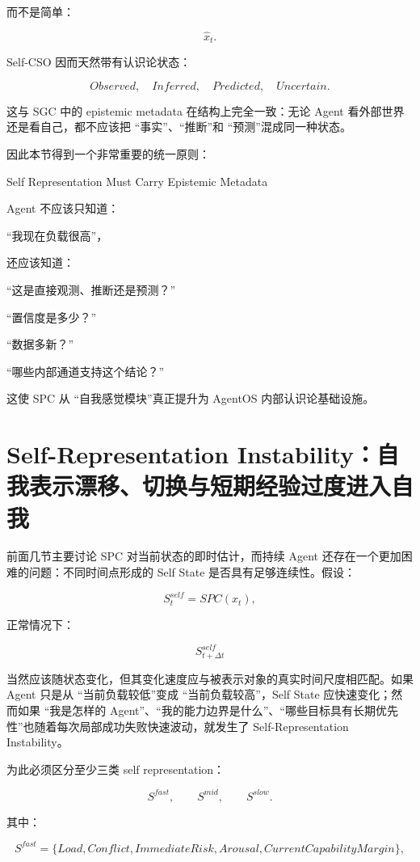 而不是简单：

\[
\hat{x}_t.
\]

Self-CSO 因而天然带有认识论状态：

\[
Observed,
\quad
Inferred,
\quad
Predicted,
\quad
Uncertain.
\]

这与 SGC 中的 epistemic metadata 在结构上完全一致：无论 Agent 看外部世界还是看自己，都不应该把 ``事实''、``推断''和 ``预测''混成同一种状态。

因此本节得到一个非常重要的统一原则：

\begin{proposition*}
Self Representation Must Carry Epistemic Metadata
\end{proposition*}

Agent 不应该只知道：

``我现在负载很高''，

还应该知道：

``这是直接观测、推断还是预测？''

``置信度是多少？''

``数据多新？''

``哪些内部通道支持这个结论？''

这使 SPC 从 ``自我感觉模块''真正提升为 AgentOS 内部认识论基础设施。

\section{Self-Representation Instability：自我表示漂移、切换与短期经验过度进入自我}

前面几节主要讨论 SPC 对当前状态的即时估计，而持续 Agent 还存在一个更加困难的问题：不同时间点形成的 Self State 是否具有足够连续性。假设：

\[
S_t^{self}=SPC(x_t),
\]

正常情况下：

\[
S_{t+\Delta t}^{self}
\]

当然应该随状态变化，但其变化速度应与被表示对象的真实时间尺度相匹配。如果 Agent 只是从 ``当前负载较低''变成 ``当前负载较高''，Self State 应快速变化；然而如果 ``我是怎样的 Agent''、``我的能力边界是什么''、``哪些目标具有长期优先性''也随着每次局部成功失败快速波动，就发生了 Self-Representation Instability。

为此必须区分至少三类 self representation：

\[
S^{fast},
\qquad
S^{mid},
\qquad
S^{slow}.
\]

其中：

\[
S^{fast}
=
\{
Load,
Conflict,
ImmediateRisk,
Arousal,
CurrentCapabilityMargin
\},
\]

